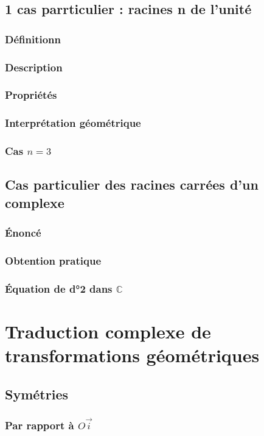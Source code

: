 \documentclass[12pt,a4paper,french]{book}
\begin{document}
		\subsection{1 cas parrticulier : racines n de l'unité}
			\subsubsection{Définitionn}
			\subsubsection{Description}
			\subsubsection{Propriétés}
			\subsubsection{Interprétation géométrique}
			\subsubsection{Cas $n=3$}
		\subsection{Cas particulier des racines carrées d'un complexe}
			\subsubsection{Énoncé}
			\subsubsection{Obtention pratique}
			\subsubsection{Équation de d°2 dans $\mathbb{C}$}
	\section{Traduction complexe de transformations géométriques}
		\subsection{Symétries}
			\subsubsection{Par rapport à $O\overrightarrow{i}$}
\end{document}
